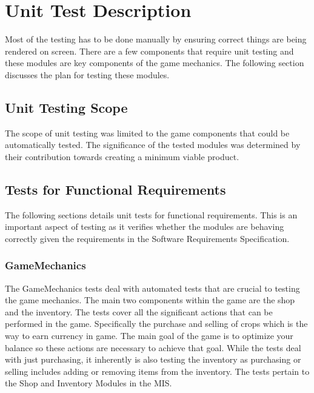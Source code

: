 \documentclass[12pt, titlepage]{article}
\begin{document}
\section{Unit Test Description}
Most of the testing has to be done manually by ensuring correct things are being rendered on screen. There are a few components that require unit testing and these modules are key components of the game mechanics. The following section discusses the plan for testing these modules.

\subsection{Unit Testing Scope}
The scope of unit testing was limited to the game components that could be automatically tested. The significance of the tested modules was determined by their contribution towards creating a minimum viable product.

\subsection{Tests for Functional Requirements}
The following sections details unit tests for functional requirements. This is an important aspect of testing as it verifies whether the modules are behaving correctly given the requirements in the Software Requirements Specification. 

\subsubsection{GameMechanics}
  
The GameMechanics tests deal with automated tests that are crucial to testing the game mechanics. The main two components within the game are the shop and the inventory. The tests cover all the significant actions that can be performed in the game. Specifically the purchase and selling of crops which is the way to earn currency in game. The main goal of the game is to optimize your balance so these actions are necessary to achieve that goal. While the tests deal with just purchasing, it inherently is also testing the inventory as purchasing or selling includes adding or removing items from the inventory. The tests pertain to the Shop and Inventory Modules in the MIS.
\end{document}
